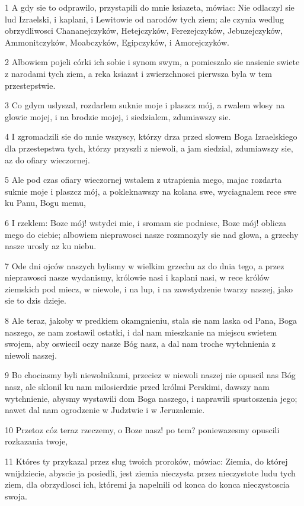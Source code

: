 \par 1 A gdy sie to odprawilo, przystapili do mnie ksiazeta, mówiac: Nie odlaczyl sie lud Izraelski, i kaplani, i Lewitowie od narodów tych ziem; ale czynia wedlug obrzydliwosci Chananejczyków, Hetejczyków, Ferezejczyków, Jebuzejczyków, Ammonitczyków, Moabczyków, Egipczyków, i Amorejczyków.
\par 2 Albowiem pojeli córki ich sobie i synom swym, a pomieszalo sie nasienie swiete z narodami tych ziem, a reka ksiazat i zwierzchnosci pierwsza byla w tem przestepstwie.
\par 3 Co gdym uslyszal, rozdarlem suknie moje i plaszcz mój, a rwalem wlosy na glowie mojej, i na brodzie mojej, i siedzialem, zdumiawszy sie.
\par 4 I zgromadzili sie do mnie wszyscy, którzy drza przed slowem Boga Izraelskiego dla przestepstwa tych, którzy przyszli z niewoli, a jam siedzial, zdumiawszy sie, az do ofiary wieczornej.
\par 5 Ale pod czas ofiary wieczornej wstalem z utrapienia mego, majac rozdarta suknie moje i plaszcz mój, a pokleknawszy na kolana swe, wyciagnalem rece swe ku Panu, Bogu memu,
\par 6 I rzeklem: Boze mój! wstydci mie, i sromam sie podniesc, Boze mój! oblicza mego do ciebie; albowiem nieprawosci nasze rozmnozyly sie nad glowa, a grzechy nasze urosly az ku niebu.
\par 7 Ode dni ojców naszych bylismy w wielkim grzechu az do dnia tego, a przez nieprawosci nasze wydanismy, królowie nasi i kaplani nasi, w rece królów ziemskich pod miecz, w niewole, i na lup, i na zawstydzenie twarzy naszej, jako sie to dzis dzieje.
\par 8 Ale teraz, jakoby w predkiem okamgnieniu, stala sie nam laska od Pana, Boga naszego, ze nam zostawil ostatki, i dal nam mieszkanie na miejscu swietem swojem, aby oswiecil oczy nasze Bóg nasz, a dal nam troche wytchnienia z niewoli naszej.
\par 9 Bo chociasmy byli niewolnikami, przeciez w niewoli naszej nie opuscil nas Bóg nasz, ale sklonil ku nam milosierdzie przed królmi Perskimi, dawszy nam wytchnienie, abysmy wystawili dom Boga naszego, i naprawili spustoszenia jego; nawet dal nam ogrodzenie w Judztwie i w Jeruzalemie.
\par 10 Przetoz cóz teraz rzeczemy, o Boze nasz! po tem? poniewazesmy opuscili rozkazania twoje,
\par 11 Któres ty przykazal przez slug twoich proroków, mówiac: Ziemia, do której wnijdziecie, abyscie ja posiedli, jest ziemia nieczysta przez nieczystote ludu tych ziem, dla obrzydlosci ich, któremi ja napelnili od konca do konca nieczystoscia swoja.

